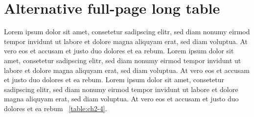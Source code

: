 \vspace*{-\topskip}
\section{Alternative full-page long table}

Lorem ipsum dolor sit amet, consetetur sadipscing elitr, sed diam nonumy eirmod tempor invidunt ut labore et dolore magna aliquyam erat, sed diam voluptua. At vero eos et accusam et justo duo dolores et ea rebum. Lorem ipsum dolor sit amet, consetetur sadipscing elitr, sed diam nonumy eirmod tempor invidunt ut labore et dolore magna aliquyam erat, sed diam voluptua. At vero eos et accusam et justo duo dolores et ea rebum. Lorem ipsum dolor sit amet, consetetur sadipscing elitr, sed diam nonumy eirmod tempor invidunt ut labore et dolore magna aliquyam erat, sed diam voluptua. At vero eos et accusam et justo duo dolores et ea rebum \tablename\ \ref{table:ch2-4}.

